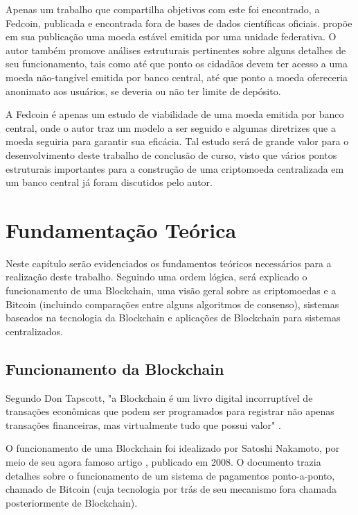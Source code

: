 \documentclass[openright]{normas-utf-tex} %
\begin{document}
Apenas um trabalho que compartilha objetivos com este foi encontrado, a Fedcoin, publicada e encontrada fora de bases de dados científicas oficiais.  propõe em sua publicação uma moeda estável emitida por uma unidade federativa. O autor também promove análises estruturais pertinentes sobre alguns detalhes de seu funcionamento, tais como até que ponto os cidadãos devem ter acesso a uma moeda não-tangível emitida por banco central, até que ponto a moeda ofereceria anonimato aos usuários, se deveria ou não ter limite de depósito. 

A Fedcoin é apenas um estudo de viabilidade de uma moeda emitida por banco central, onde o autor traz um modelo a ser seguido e algumas diretrizes que a moeda seguiria para garantir sua eficácia. Tal estudo será de grande valor para o desenvolvimento deste trabalho de conclusão de curso, visto que vários pontos estruturais importantes para a construção de uma criptomoeda centralizada em um banco central já foram discutidos pelo autor.


\chapter{Fundamentação Teórica}
\label{chap:fund}

Neste capítulo serão evidenciados os fundamentos teóricos necessários para a realização deste trabalho. Seguindo uma ordem lógica, será explicado o funcionamento de uma Blockchain, uma visão geral sobre as criptomoedas e a Bitcoin (incluindo comparações entre alguns algoritmos de consenso), sistemas baseados na tecnologia da Blockchain e aplicações de Blockchain para sistemas centralizados.

\section{Funcionamento da Blockchain}

Segundo Don Tapscott, "a Blockchain é um livro digital incorruptível de transações econômicas que podem ser programados para registrar não apenas transações financeiras, mas virtualmente tudo que possui valor" \cite{Tapscott2016}.

O funcionamento de uma Blockchain foi idealizado por Satoshi Nakamoto, por meio de seu agora famoso artigo \cite{Nakamoto2008}, publicado em 2008. O documento trazia detalhes sobre o funcionamento de um sistema de pagamentos ponto-a-ponto, chamado de Bitcoin (cuja tecnologia por trás de seu mecanismo fora chamada posteriormente de Blockchain).
\end{document}
